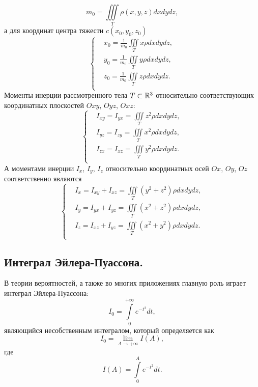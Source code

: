 \begin{itemize}
\begin{equation}
		\label{eq:lecture7-19}
		\boxed{m_0 = \iiint\limits_T \rho(x, y, z) dx dy dz,}
	\end{equation}
	а для координат центра тяжести $c(x_0, y_0, z_0)$
	\begin{equation}
		\label{eq:lecture7-20}
		\begin{cases}
			&x_0 = \frac{1}{m_0}\iiint\limits_Tx \rho dx dy dz,\\
			&y_0 = \frac{1}{m_0}\iiint\limits_Ty \rho dx dy dz,\\
			&z_0 = \frac{1}{m_0}\iiint\limits_Tz \rho dx dy dz.\\
		\end{cases}
	\end{equation}
	Моменты инерции рассмотренного тела $T \subset \mathbb{R}^{3}$ относительно соответствующих
	координатных плоскостей $Oxy$, $Oyz$, $Oxz$:
	\begin{equation}
		\label{eq:lecture7-21}
		\begin{cases}
			&I_{xy} = I_{yx} = \iiint\limits_Tz^2 \rho dx dy dz,\\
			&I_{yz} = I_{zy} = \iiint\limits_Tx^2 \rho dx dy dz,\\
			&I_{zx} = I_{xz} = \iiint\limits_Ty^2 \rho dx dy dz.\\
		\end{cases}
	\end{equation}
	А моментами инерции $I_x$, $I_y$, $I_z$ относительно координатных осей
	$Ox$, $Oy$, $Oz$ соответственно являются
	\begin{equation}
		\label{eq:lecture7-22}
		\begin{cases}
			&I_x = I_{xy} + I_{xz} = \iiint\limits_T (y^2 + z^2) \rho dx dy dz,\\
			&I_y = I_{yx} + I_{yz} = \iiint\limits_T (x^2 + z^2) \rho dx dy dz,\\
			&I_z = I_{xz} + I_{yz} = \iiint\limits_T (x^2 + y^2) \rho dx dy dz.\\
		\end{cases}
	\end{equation}
\end{itemize}

\subsection{Интеграл Эйлера-Пуассона.}

В теории вероятностей, а также во многих приложениях
главную роль играет интеграл Эйлера-Пуассона:
\begin{equation}
	\label{eq:lecture7-23}
	I_0 = \int\limits_0^{+\infty}e^{-t^2}dt,
\end{equation}
являющийся несобственным интегралом, который определяется как
\begin{equation}
	\label{eq:lecture7-24}
	I_0 = \lim\limits_{A \to +\infty}I(A),
\end{equation}
где
\begin{equation}
	\label{eq:lecture7-25}
	I(A) = \int\limits_0^Ae^{-t^2}dt.
\end{equation}

